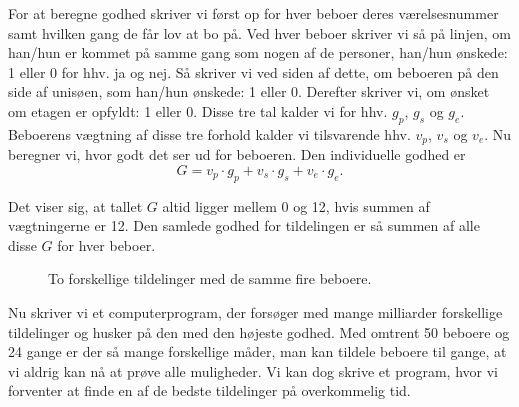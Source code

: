 \documentclass[article,oneside,11pt]{memoir}
\begin{document}
For at beregne godhed skriver vi først op for hver beboer deres værelsesnummer
samt hvilken gang de får lov at bo på. Ved hver beboer skriver vi så på linjen,
om han/hun er kommet på samme gang som nogen af de personer, han/hun ønskede: 1
eller 0 for hhv. ja og nej. Så skriver vi ved siden af dette, om beboeren på
den side af unisøen, som han/hun ønskede: 1 eller 0.  Derefter skriver vi, om
ønsket om etagen er opfyldt: 1 eller 0. Disse tre tal kalder vi for hhv. $g_p$,
$g_s$ og $g_e$.  Beboerens vægtning af disse tre forhold kalder vi tilsvarende
hhv. $v_p$, $v_s$ og $v_e$.  Nu beregner vi, hvor godt det ser ud for beboeren.
Den individuelle godhed er
\[G = v_p\cdot g_p + v_s\cdot g_s + v_e\cdot g_e.\]

Det viser sig, at tallet $G$ altid ligger mellem 0 og 12, hvis
summen af vægtningerne er 12.  Den samlede godhed for tildelingen er så summen
af alle disse $G$ for hver beboer.

\begin{figure}[h]
\begin{center}
\caption{To forskellige tildelinger med de samme fire beboere.}

\end{center}
\end{figure}

Nu skriver vi et computerprogram, der forsøger med mange milliarder forskellige
tildelinger og husker på den med den højeste godhed. Med omtrent 50 beboere og
24 gange er der så mange forskellige måder, man kan tildele beboere til gange,
at vi aldrig kan nå at prøve alle muligheder. Vi kan dog skrive et program,
hvor vi forventer at finde en af de bedste tildelinger på overkommelig tid.
\end{document}
